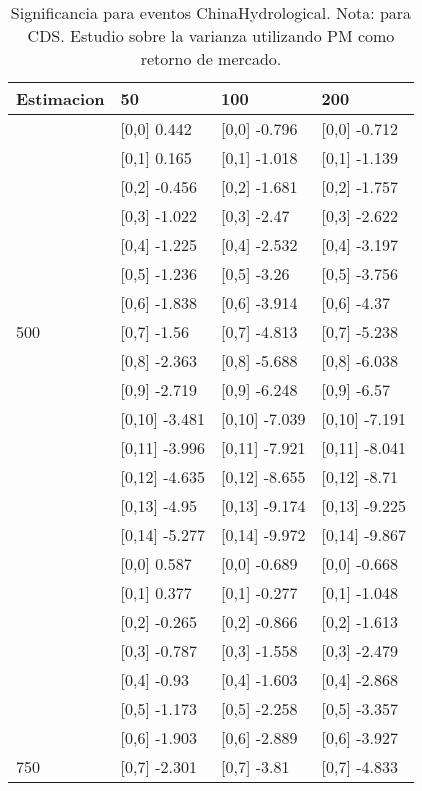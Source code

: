 \begin{table}

\caption{Significancia para eventos ChinaHydrological. Nota: para CDS. Estudio sobre la varianza utilizando PM como retorno de mercado.}
\centering
\begin{tabular}[t]{llll}
\toprule
Estimacion & 50 & 100 & 200\\
\midrule
 & {}[0,0] 0.442 & {}[0,0] -0.796 & {}[0,0] -0.712\\
 & {}[0,1] 0.165 & {}[0,1] -1.018 & {}[0,1] -1.139\\
 & {}[0,2] -0.456 & {}[0,2] -1.681 & {}[0,2] -1.757\\
 & {}[0,3] -1.022 & {}[0,3] -2.47 & {}[0,3] -2.622\\
 & {}[0,4] -1.225 & {}[0,4] -2.532 & {}[0,4] -3.197\\
\addlinespace
 & {}[0,5] -1.236 & {}[0,5] -3.26 & {}[0,5] -3.756\\
 & {}[0,6] -1.838 & {}[0,6] -3.914 & {}[0,6] -4.37\\
500 & {}[0,7] -1.56 & {}[0,7] -4.813 & {}[0,7] -5.238\\
 & {}[0,8] -2.363 & {}[0,8] -5.688 & {}[0,8] -6.038\\
 & {}[0,9] -2.719 & {}[0,9] -6.248 & {}[0,9] -6.57\\
\addlinespace
 & {}[0,10] -3.481 & {}[0,10] -7.039 & {}[0,10] -7.191\\
 & {}[0,11] -3.996 & {}[0,11] -7.921 & {}[0,11] -8.041\\
 & {}[0,12] -4.635 & {}[0,12] -8.655 & {}[0,12] -8.71\\
 & {}[0,13] -4.95 & {}[0,13] -9.174 & {}[0,13] -9.225\\
 & {}[0,14] -5.277 & {}[0,14] -9.972 & {}[0,14] -9.867\\
\addlinespace
 & {}[0,0] 0.587 & {}[0,0] -0.689 & {}[0,0] -0.668\\
 & {}[0,1] 0.377 & {}[0,1] -0.277 & {}[0,1] -1.048\\
 & {}[0,2] -0.265 & {}[0,2] -0.866 & {}[0,2] -1.613\\
 & {}[0,3] -0.787 & {}[0,3] -1.558 & {}[0,3] -2.479\\
 & {}[0,4] -0.93 & {}[0,4] -1.603 & {}[0,4] -2.868\\
\addlinespace
 & {}[0,5] -1.173 & {}[0,5] -2.258 & {}[0,5] -3.357\\
 & {}[0,6] -1.903 & {}[0,6] -2.889 & {}[0,6] -3.927\\
750 & {}[0,7] -2.301 & {}[0,7] -3.81 & {}[0,7] -4.833\\

\end{tabular}
\end{table}
